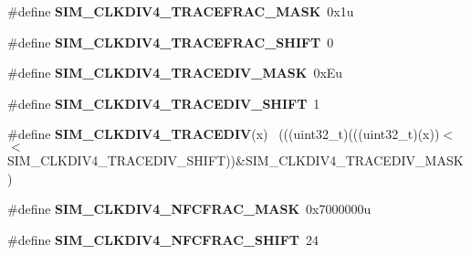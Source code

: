 \begin{DoxyCompactItemize}
\item 
\hypertarget{group___s_i_m___register___masks_ga34a82bd71d630c9bcab5016ad772913f}{}\#define {\bfseries S\+I\+M\+\_\+\+C\+L\+K\+D\+I\+V4\+\_\+\+T\+R\+A\+C\+E\+F\+R\+A\+C\+\_\+\+M\+A\+S\+K}~0x1u\label{group___s_i_m___register___masks_ga34a82bd71d630c9bcab5016ad772913f}

\item 
\hypertarget{group___s_i_m___register___masks_ga91b06d902d91e8fb4fc1b63d17a3d040}{}\#define {\bfseries S\+I\+M\+\_\+\+C\+L\+K\+D\+I\+V4\+\_\+\+T\+R\+A\+C\+E\+F\+R\+A\+C\+\_\+\+S\+H\+I\+F\+T}~0\label{group___s_i_m___register___masks_ga91b06d902d91e8fb4fc1b63d17a3d040}

\item 
\hypertarget{group___s_i_m___register___masks_gaa0574936475fb6f508d0be042aef470b}{}\#define {\bfseries S\+I\+M\+\_\+\+C\+L\+K\+D\+I\+V4\+\_\+\+T\+R\+A\+C\+E\+D\+I\+V\+\_\+\+M\+A\+S\+K}~0x\+Eu\label{group___s_i_m___register___masks_gaa0574936475fb6f508d0be042aef470b}

\item 
\hypertarget{group___s_i_m___register___masks_gaad20e97113c645624096cdf1bbae9267}{}\#define {\bfseries S\+I\+M\+\_\+\+C\+L\+K\+D\+I\+V4\+\_\+\+T\+R\+A\+C\+E\+D\+I\+V\+\_\+\+S\+H\+I\+F\+T}~1\label{group___s_i_m___register___masks_gaad20e97113c645624096cdf1bbae9267}

\item 
\hypertarget{group___s_i_m___register___masks_ga82bdf559592706c1f91c1b34759bf9cb}{}\#define {\bfseries S\+I\+M\+\_\+\+C\+L\+K\+D\+I\+V4\+\_\+\+T\+R\+A\+C\+E\+D\+I\+V}(x)                                ~(((uint32\+\_\+t)(((uint32\+\_\+t)(x))$<$$<$S\+I\+M\+\_\+\+C\+L\+K\+D\+I\+V4\+\_\+\+T\+R\+A\+C\+E\+D\+I\+V\+\_\+\+S\+H\+I\+F\+T))\&S\+I\+M\+\_\+\+C\+L\+K\+D\+I\+V4\+\_\+\+T\+R\+A\+C\+E\+D\+I\+V\+\_\+\+M\+A\+S\+K)\label{group___s_i_m___register___masks_ga82bdf559592706c1f91c1b34759bf9cb}

\item 
\hypertarget{group___s_i_m___register___masks_gad155e36df36f88be4519658bd9b5a6b8}{}\#define {\bfseries S\+I\+M\+\_\+\+C\+L\+K\+D\+I\+V4\+\_\+\+N\+F\+C\+F\+R\+A\+C\+\_\+\+M\+A\+S\+K}~0x7000000u\label{group___s_i_m___register___masks_gad155e36df36f88be4519658bd9b5a6b8}

\item 
\hypertarget{group___s_i_m___register___masks_ga81f5dc702d1fcc992928e968fa2fe321}{}\#define {\bfseries S\+I\+M\+\_\+\+C\+L\+K\+D\+I\+V4\+\_\+\+N\+F\+C\+F\+R\+A\+C\+\_\+\+S\+H\+I\+F\+T}~24\label{group___s_i_m___register___masks_ga81f5dc702d1fcc992928e968fa2fe321}


\end{DoxyCompactItemize}
